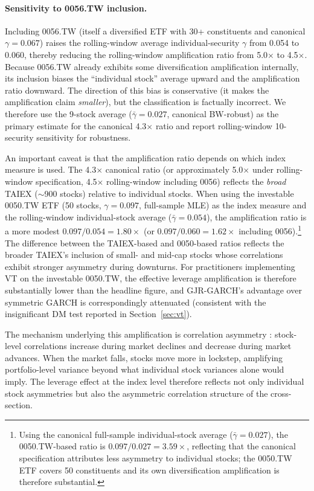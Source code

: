 \paragraph{Sensitivity to 0056.TW inclusion.} Including 0056.TW (itself a diversified ETF with 30+ constituents and canonical $\gamma = 0.067$) raises the rolling-window average individual-security $\gamma$ from 0.054 to 0.060, thereby reducing the rolling-window amplification ratio from 5.0$\times$ to 4.5$\times$. Because 0056.TW already exhibits some diversification amplification internally, its inclusion biases the ``individual stock'' average upward and the amplification ratio downward. The direction of this bias is conservative (it makes the amplification claim \textit{smaller}), but the classification is factually incorrect. We therefore use the 9-stock average ($\bar{\gamma} = 0.027$, canonical BW-robust) as the primary estimate for the canonical 4.3$\times$ ratio and report rolling-window 10-security sensitivity for robustness.

An important caveat is that the amplification ratio depends on which index measure is used. The 4.3$\times$ canonical ratio (or approximately 5.0$\times$ under rolling-window specification, 4.5$\times$ rolling-window including 0056) reflects the \textit{broad} TAIEX ($\sim$900 stocks) relative to individual stocks. When using the investable 0050.TW ETF (50 stocks, $\gamma = 0.097$, full-sample MLE) as the index measure and the rolling-window individual-stock average ($\bar{\gamma} = 0.054$), the amplification ratio is a more modest $0.097 / 0.054 = 1.80\times$ (or $0.097 / 0.060 = 1.62\times$ including 0056).\footnote{Using the canonical full-sample individual-stock average ($\bar{\gamma} = 0.027$), the 0050.TW-based ratio is $0.097/0.027 = 3.59\times$, reflecting that the canonical specification attributes less asymmetry to individual stocks; the 0050.TW ETF covers 50 constituents and its own diversification amplification is therefore substantial.} The difference between the TAIEX-based and 0050-based ratios reflects the broader TAIEX's inclusion of small- and mid-cap stocks whose correlations exhibit stronger asymmetry during downturns. For practitioners implementing VT on the investable 0050.TW, the effective leverage amplification is therefore substantially lower than the headline figure, and GJR-GARCH's advantage over symmetric GARCH is correspondingly attenuated (consistent with the insignificant DM test reported in Section~\ref{sec:vt}).

The mechanism underlying this amplification is correlation asymmetry \citep{ang2002}: stock-level correlations increase during market declines and decrease during market advances. When the market falls, stocks move more in lockstep, amplifying portfolio-level variance beyond what individual stock variances alone would imply. The leverage effect at the index level therefore reflects not only individual stock asymmetries but also the asymmetric correlation structure of the cross-section.

